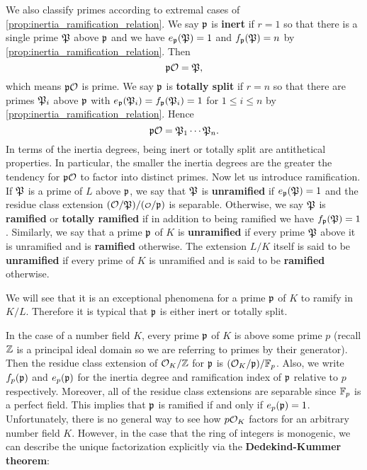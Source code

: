     We also classify primes according to extremal cases of \cref{prop:inertia_ramification_relation}. We say $\mathfrak{p}$ is \textbf{inert} if $r = 1$ so that there is a single prime $\mathfrak{P}$ above $\mathfrak{p}$ and we have $e_{\mathfrak{p}}(\mathfrak{P}) = 1$ and $f_{\mathfrak{p}}(\mathfrak{P}) = n$ by \cref{prop:inertia_ramification_relation}. Then
    \[
      \mathfrak{p}\mathcal{O} = \mathfrak{P},
    \]
    which means $\mathfrak{p}\mathcal{O}$ is prime. We say $\mathfrak{p}$ is \textbf{totally split} if $r = n$ so that there are primes $\mathfrak{P}_{i}$ above $\mathfrak{p}$ with $e_{\mathfrak{p}}(\mathfrak{P}_{i}) = f_{\mathfrak{p}}(\mathfrak{P}_{i}) = 1$ for $1 \le i \le n$ by \cref{prop:inertia_ramification_relation}. Hence
    \[
      \mathfrak{p}\mathcal{O} = \mathfrak{P}_{1} \cdots \mathfrak{P}_{n}.
    \]
    In terms of the inertia degrees, being inert or totally split are antithetical properties. In particular, the smaller the inertia degrees are the greater the tendency for $\mathfrak{p}\mathcal{O}$ to factor into distinct primes. Now let us introduce ramification. If $\mathfrak{P}$ is a prime of $L$ above $\mathfrak{p}$, we say that $\mathfrak{P}$ is \textbf{unramified} if $e_{\mathfrak{p}}(\mathfrak{P}) = 1$ and the residue class extension $(\mc{O}/\mf{P})/(\smc{O}/\mf{p})$ is separable. Otherwise, we say $\mathfrak{P}$ is \textbf{ramified} or \textbf{totally ramified} if in addition to being ramified we have $f_{\mathfrak{p}}(\mathfrak{P}) = 1$. Similarly, we say that a prime $\mathfrak{p}$ of $K$ is \textbf{unramified} if every prime $\mathfrak{P}$ above it is unramified and is \textbf{ramified} otherwise. The extension $L/K$ itself is said to be \textbf{unramified} if every prime of $K$ is unramified and is said to be \textbf{ramified} otherwise.

    \begin{remark}
      We will see that it is an exceptional phenomena for a prime $\mathfrak{p}$ of $K$ to ramify in $K/L$. Therefore it is typical that $\mathfrak{p}$ is either inert or totally split.
    \end{remark}

    In the case of a number field $K$, every prime $\mathfrak{p}$ of $K$ is above some prime $p$ (recall $\mathbb{Z}$ is a principal ideal domain so we are referring to primes by their generator). Then the residue class extension of $\mathcal{O}_{K}/\mathbb{Z}$ for $\mathfrak{p}$ is $(\mathcal{O}_{K}/\mathfrak{p})/\mathbb{F}_{p}$. Also, we write $f_{p}(\mathfrak{p})$ and $e_{p}(\mathfrak{p})$ for the inertia degree and ramification index of $\mathfrak{p}$ relative to $p$ respectively. Moreover, all of the residue class extensions are separable since $\mathbb{F}_{p}$ is a perfect field. This implies that $\mathfrak{p}$ is ramified if and only if $e_{p}(\mathfrak{p}) = 1$. Unfortunately, there is no general way to see how $p\mathcal{O}_{K}$ factors for an arbitrary number field $K$. However, in the case that the ring of integers is monogenic, we can describe the unique factorization explicitly via the \textbf{Dedekind-Kummer theorem}:

